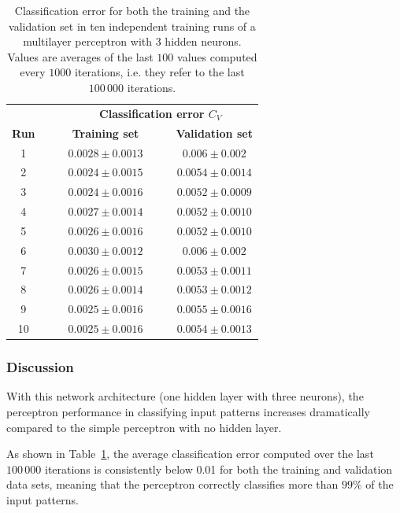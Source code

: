 \documentclass[12pt,titlepage]{article}
\begin{document}
\begin{table}[htbp]
\centering
\begin{tabular}{ccccc}
\toprule
   &  $\quad $ & \multicolumn{3}{c}{\textbf{Classification error $C_V$}}\\
\cmidrule{3-5}
\textbf{Run} & & \textbf{Training set}  &  $\quad $ & \textbf{Validation set}\\
\midrule
1 & &  $0.0028 \pm 0.0013$  & & $0.006 \pm 0.002$ \\
2 & &  $0.0024 \pm 0.0015$  & & $0.0054 \pm 0.0014$ \\
3 & &  $0.0024 \pm 0.0016$  & & $0.0052 \pm 0.0009$ \\
4 & &  $0.0027 \pm 0.0014$  & & $0.0052 \pm 0.0010$ \\
5 & &  $0.0026 \pm 0.0016$  & & $0.0052 \pm 0.0010$ \\
6 & &  $0.0030 \pm 0.0012$  & & $0.006 \pm 0.002$ \\
7 & &  $0.0026 \pm 0.0015$  & & $0.0053 \pm 0.0011$ \\
8 & &  $0.0026 \pm 0.0014$  & & $0.0053 \pm 0.0012$ \\
9 & &  $0.0025 \pm 0.0016$  & & $0.0055 \pm 0.0016$ \\
10 & &  $0.0025 \pm 0.0016$  & & $0.0054 \pm 0.0013$ \\
\bottomrule
\end{tabular}
\caption{\footnotesize Classification error for both the training and the validation set in ten independent training runs of a multilayer perceptron with 3 hidden neurons. Values are averages of the last $100$ values computed every $1000$ iterations, i.e. they refer to the last $100\,000$ iterations.}
\label{tab:2c}
\end{table}

\subsubsection*{Discussion}

With this network architecture (one hidden layer with three neurons), the perceptron performance in classifying input patterns increases dramatically compared to the simple perceptron with no hidden layer. 

As shown in Table~\ref{tab:2c}, the average classification error computed over the last $100\,000$ iterations is consistently below 0.01 for both the training and validation data sets, meaning that the perceptron correctly classifies more than $99\%$ of the input patterns.
\end{document}
